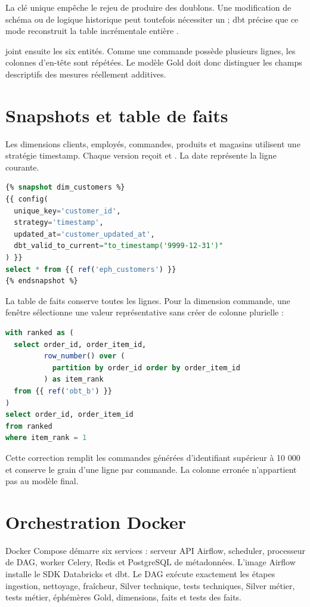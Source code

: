 La clé unique empêche le rejeu de produire des doublons. Une modification de schéma ou de logique historique peut toutefois nécessiter un ; dbt précise que ce mode reconstruit la table incrémentale entière \cite{dbt-incremental}.

 joint ensuite les six entités. Comme une commande possède plusieurs lignes, les colonnes d'en-tête sont répétées. Le modèle Gold doit donc distinguer les champs descriptifs des mesures réellement additives.

\section{Snapshots et table de faits}
Les dimensions clients, employés, commandes, produits et magasins utilisent une stratégie timestamp. Chaque version reçoit  et . La date  représente la ligne courante.

\begin{lstlisting}[language=SQL,caption={Snapshot SCD 2 conceptuel}]
{% snapshot dim_customers %}
{{ config(
  unique_key='customer_id',
  strategy='timestamp',
  updated_at='customer_updated_at',
  dbt_valid_to_current="to_timestamp('9999-12-31')"
) }}
select * from {{ ref('eph_customers') }}
{% endsnapshot %}
\end{lstlisting}

La table de faits conserve toutes les lignes. Pour la dimension commande, une fenêtre sélectionne une valeur représentative sans créer de colonne plurielle :

\begin{lstlisting}[language=SQL,caption={Correction de order\_item\_id dans dim\_orders}]
with ranked as (
  select order_id, order_item_id,
         row_number() over (
           partition by order_id order by order_item_id
         ) as item_rank
  from {{ ref('obt_b') }}
)
select order_id, order_item_id
from ranked
where item_rank = 1
\end{lstlisting}

Cette correction remplit les commandes générées d'identifiant supérieur à 10 000 et conserve le grain d'une ligne par commande. La colonne erronée  n'appartient pas au modèle final.

\section{Orchestration Docker}
Docker Compose démarre six services : serveur API Airflow, scheduler, processeur de DAG, worker Celery, Redis et PostgreSQL de métadonnées. L'image Airflow installe le SDK Databricks et dbt. Le DAG exécute exactement les étapes ingestion, nettoyage, fraîcheur, Silver technique, tests techniques, Silver métier, tests métier, éphémères Gold, dimensions, faits et tests des faits.

